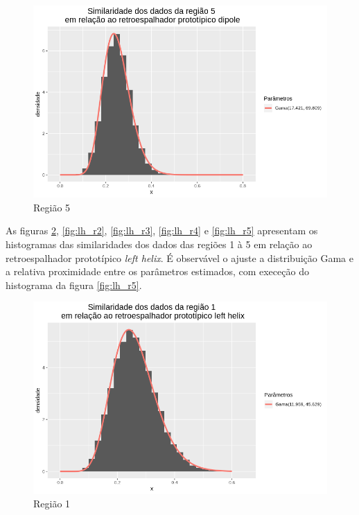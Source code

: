 \documentclass[12pt]{article}
\begin{document}
\begin{figure}[!h]
    \centering
    \includegraphics[width = \linewidth]{../../Images/Report_18_12_20/dip_region5.png}
    \caption{Região 5}
    \label{fig:dip_r5}
\end{figure}

As figuras \ref{fig:lh_r1}, \ref{fig:lh_r2}, \ref{fig:lh_r3}, \ref{fig:lh_r4} e \ref{fig:lh_r5} apresentam os histogramas das similaridades dos dados das regiões 1 à 5 em relação ao retroespalhador prototípico \textit{left helix}. É observável o ajuste a distribuição Gama e a relativa proximidade entre os parâmetros estimados, com execeção do histograma da figura \ref{fig:lh_r5}.

\begin{figure}[!h]
    \centering
    \includegraphics[width = \linewidth]{../../Images/Report_18_12_20/lh_region1.png}
    \caption{Região 1}
    \label{fig:lh_r1}
\end{figure}
\end{document}
